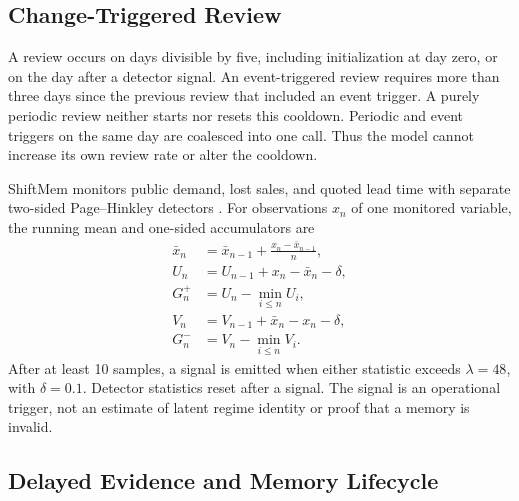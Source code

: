 \subsection{Change-Triggered Review}
\label{sec:change-review}

A review occurs on days divisible by five, including initialization at day
zero, or on the day after a detector signal. An event-triggered review requires
more than three days since the previous review that included an event trigger. A
purely periodic
review neither starts nor resets this cooldown. Periodic and event triggers on
the same day are coalesced into one call. Thus the model cannot increase its own
review rate or alter the cooldown.

ShiftMem monitors public demand, lost sales, and quoted lead time with separate
two-sided Page--Hinkley detectors \citep{page1954continuous}. For observations
$x_n$ of one monitored variable, the running mean and one-sided accumulators are
\begin{align}
 \bar{x}_n &= \bar{x}_{n-1}+\tfrac{x_n-\bar{x}_{n-1}}{n}, \nonumber\\
 U_n &= U_{n-1}+x_n-\bar{x}_n-\delta, \nonumber\\
 G_n^{+} &= U_n-\min_{i\leq n}U_i, \label{eq:page-hinkley}\\
 V_n &= V_{n-1}+\bar{x}_n-x_n-\delta, \nonumber\\
 G_n^{-} &= V_n-\min_{i\leq n}V_i. \nonumber
\end{align}
After at least 10 samples, a signal is emitted when either statistic exceeds
$\lambda=48$, with $\delta=0.1$. Detector statistics reset after a signal. The
signal is an operational trigger, not an estimate of latent regime identity or
proof that a memory is invalid.

\subsection{Delayed Evidence and Memory Lifecycle}
\label{sec:lifecycle}

